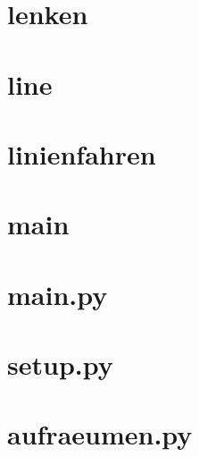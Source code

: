 \documentclass[a4paper, 12pt]{scrartcl}
\begin{document}
\section{lenken}


\section{line}


\section{linienfahren}


\section{main}


\section{main.py}


\section{setup.py}


\section{aufraeumen.py}

\end{document}
